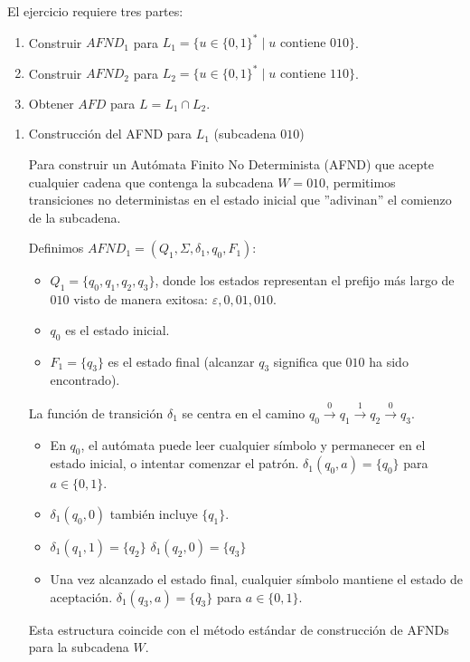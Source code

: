 \begin{solucion}
El ejercicio requiere tres partes:
\begin{enumerate}
    \item Construir $AFND_1$ para $L_1 = \{u \in \{0, 1\}^* \mid u \text{ contiene } 010\}$.
    \item Construir $AFND_2$ para $L_2 = \{u \in \{0, 1\}^* \mid u \text{ contiene } 110\}$.
    \item Obtener $AFD$ para $L = L_1 \cap L_2$.
\end{enumerate}

\begin{enumerate}

\item Construcción del AFND para $L_1$ (subcadena $010$)

Para construir un Autómata Finito No Determinista (AFND) que acepte cualquier cadena que contenga la subcadena $W=010$, permitimos transiciones no deterministas en el estado inicial que ''adivinan'' el comienzo de la subcadena.

Definimos $AFND_1 = (Q_1, \Sigma, \delta_1, q_0, F_1)$:
\begin{itemize}
    \item $Q_1 = \{q_0, q_1, q_2, q_3\}$, donde los estados representan el prefijo más largo de $010$ visto de manera exitosa: $\varepsilon, 0, 01, 010$.
    \item $q_0$ es el estado inicial.
    \item $F_1 = \{q_3\}$ es el estado final (alcanzar $q_3$ significa que $010$ ha sido encontrado).
\end{itemize}

La función de transición $\delta_1$ se centra en el camino $q_0 \xrightarrow{0} q_1 \xrightarrow{1} q_2 \xrightarrow{0} q_3$.

\begin{itemize}
    \item {} En $q_0$, el autómata puede leer cualquier símbolo y permanecer en el estado inicial, o intentar comenzar el patrón. $\delta_1(q_0, a) = \{q_0\}$ para $a \in \{0, 1\}$.
    \item {} $\delta_1(q_0, 0)$ también incluye $\{q_1\}$.
    \item {}
    $\delta_1(q_1, 1) = \{q_2\}$
    $\delta_1(q_2, 0) = \{q_3\}$
    \item {} Una vez alcanzado el estado final, cualquier símbolo mantiene el estado de aceptación. $\delta_1(q_3, a) = \{q_3\}$ para $a \in \{0, 1\}$.
\end{itemize}
Esta estructura coincide con el método estándar de construcción de AFNDs para la subcadena $W$.


\end{enumerate}
\end{solucion}
